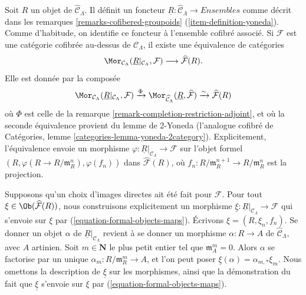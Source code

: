\begin{remark}
\label{remark-formal-objects-yoneda}
Soit $R$ un objet de $\widehat{\mathcal{C}}_\Lambda$. Il définit un foncteur
$\underline{R}: \widehat{\mathcal{C}}_\Lambda \to \textit{Ensembles}$
comme décrit dans les remarques \ref{remarks-cofibered-groupoids}
(\ref{item-definition-yoneda}). Comme d'habitude, on identifie ce foncteur à
l'ensemble cofibré associé. Si $\mathcal{F}$ est une catégorie cofibrée
au-dessus de $\mathcal{C}_\Lambda$, il existe une équivalence de catégories
\begin{equation}
\label{equation-formal-objects-maps}
\Mor_{\mathcal{C}_\Lambda}(
\underline{R}|_{\mathcal{C}_\Lambda}, \mathcal{F})
\longrightarrow
\widehat{\mathcal{F}}(R).
\end{equation}
Elle est donnée par la composée
$$
\Mor_{\mathcal{C}_\Lambda}(
\underline{R}|_{\mathcal{C}_\Lambda}, \mathcal{F})
\xrightarrow{\Phi}
\Mor_{\widehat{\mathcal{C}}_\Lambda}(
\underline{R}, \widehat{\mathcal{F}})
\xrightarrow{\sim}
\widehat{\mathcal{F}}(R)
$$
où $\Phi$ est celle de la remarque
\ref{remark-completion-restriction-adjoint}, et où la seconde équivalence
provient du lemme de 2-Yoneda (l'analogue cofibré de Catégories, lemme
\ref{categories-lemma-yoneda-2category}). Explicitement, l'équivalence envoie
un morphisme
$\varphi : \underline{R}|_{\mathcal{C}_\Lambda} \to \mathcal{F}$
sur l'objet formel
$(R, \varphi(R \to R/\mathfrak{m}_R^n), \varphi(f_n))$ dans
$\widehat{\mathcal{F}}(R)$, où
$f_n : R/\mathfrak m_R^{n + 1} \to R/\mathfrak m_R^n$ est la projection.

\medskip\noindent
Supposons qu'un choix d'images directes ait été fait pour $\mathcal{F}$.
Pour tout $\xi \in \Ob(\widehat{\mathcal{F}}(R))$, nous construisons
explicitement un morphisme
$\underline{\xi} : \underline{R}|_{\mathcal{C}_\Lambda} \to \mathcal{F}$
qui s'envoie sur $\xi$ par (\ref{equation-formal-objects-maps}). Écrivons
$\xi = (R, \xi_n, f_n)$. Se donner un objet $\alpha$ de
$\underline{R}|_{\mathcal{C}_\Lambda}$ revient à se donner un morphisme
$\alpha : R \to A$ de $\widehat{\mathcal{C}}_\Lambda$, avec $A$ artinien.
Soit $m \in \mathbf{N}$ le plus petit entier tel que
$\mathfrak m_A^m = 0$. Alors $\alpha$ se factorise par un unique
$\alpha_m : R/\mathfrak m_R^m \to A$, et l'on peut poser
$\underline{\xi}(\alpha) = \alpha_{m, *}\xi_m$. Nous omettons la description
de $\underline{\xi}$ sur les morphismes, ainsi que la démonstration du fait
que $\underline{\xi}$ s'envoie sur $\xi$ par
(\ref{equation-formal-objects-maps}).


\end{remark}

